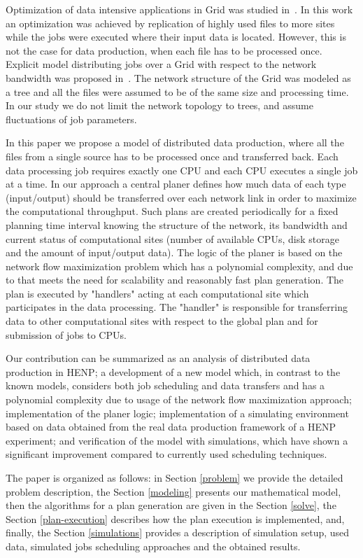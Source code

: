 \documentclass{svjour3}                     %
\begin{document}
Optimization of data intensive applications in Grid was studied
in~\cite{Globus_scheduler}. In this work an optimization was achieved by
replication of highly used files to more sites while the jobs were executed
where their input data is located. However, this is not the case for data
production, when each file has to be processed once. 
%
Explicit model distributing jobs over a Grid with respect to the network
bandwidth was proposed in~\cite{Trees}. The network structure of the Grid was
modeled as a tree and all the files were assumed to be of the same size and
processing time. In our study we do not limit the network topology to trees,
and assume fluctuations of job parameters. 

In this paper we propose a model of distributed data production, where all the files from a single source has to be processed once and transferred back. Each data processing job requires exactly one CPU and each CPU executes a single job at a time. In our approach a central planer defines how much data of each type (input/output) should be transferred over each network link in order to maximize the computational throughput. Such plans are created periodically for a fixed planning time interval knowing the structure of the network, its bandwidth and current status of computational sites (number of available CPUs, disk storage and the amount of input/output data). The logic of the planer is based on the network flow maximization problem which has a polynomial complexity, and due to that meets the need for scalability and reasonably fast plan generation. The plan is executed by "handlers" acting at each computational site which participates in the data processing. The "handler" is responsible for transferring data to other computational sites with respect to the global plan and for submission of jobs to CPUs. 
 
Our contribution can be summarized as an analysis of distributed data production in HENP; a development of a new model which, in contrast to the known models, considers both job scheduling and data transfers and has a polynomial complexity due to usage of the network flow maximization approach; implementation of the planer logic; implementation of a simulating environment based on data obtained from the real data production framework of a HENP experiment; and verification of the model with simulations, which have shown a significant improvement compared to currently used scheduling techniques. 

The paper is organized as follows: in Section \ref{problem} we provide the detailed problem description, the Section \ref{modeling} presents our mathematical model, then the algorithms for a plan generation are given in the Section \ref{solve}, the Section \ref{plan-execution} describes how the plan execution is implemented, and, finally, the Section \ref{simulations} provides a description of simulation setup, used data, simulated jobs scheduling approaches and the obtained results. 
\end{document}
